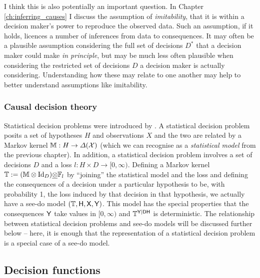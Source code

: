 I think this is also potentially an important question. In Chapter \ref{ch:inferring_causes} I discuss the assumption of \emph{imitability}, that it is within a decision maker's power to reproduce the observed data. Such an assumption, if it holds, licences a number of inferences from data to consequences. It may often be a plausible assumption considering the full set of decisions $D^*$ that a decision maker could make \emph{in principle}, but may be much less often plausible when considering the restricted set of decisions $D$ a decision maker is actually considering. Understanding how these may relate to one another may help to better understand assumptions like imitability.


\subsubsection{Causal decision theory}



Statistical decision problems were introduced by \citet{wald_statistical_1950}. A statistical decision problem posits a set of hypotheses $H$ and observations $X$ and the two are related by a Markov kernel $\mathbb{M}:H\to \Delta(\mathcal{X})$ (which we can recognise as a \emph{statistical model} from the previous chapter). In addition, a statistical decision problem involves a set of decisions $D$ and a loss $l:H\times D\to [0,\infty)$. Defining a Markov kernel $\mathbb{T}:=(\mathbb{M}\otimes\mathrm{Id}_D)\underline{\otimes} \mathbb{F}_l$ by ``joining'' the statistical model and the loss and defining the consequences of a decision under a particular hypothesis to be, with probability 1, the loss induced by that decision in that hypothesis, we actually have a see-do model $(\mathbb{T}, \mathsf{H}, \mathsf{X}, \mathsf{Y})$. This model has the special properties that the consequences $\mathsf{Y}$ take values in $[0,\infty)$ and $\mathbb{T}^{\mathsf{Y}|\mathsf{D}\mathsf{H}}$ is deterministic. The relationship between statistical decision problems and see-do models will be discussed further below -- here, it is enough that the representation of a statistical decision problem is a special case of a see-do model.



\subsection{Decision functions}

